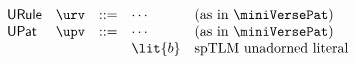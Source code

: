 \[\begin{array}{lllllll}
\mathsf{URule} & \urv & ::= 
& \cdots & \text{(as in $\miniVersePat$)}\\
\mathsf{UPat} & \upv & ::= 
& \cdots & \text{(as in $\miniVersePat$)}\\
&&& \lit{b} & \text{spTLM unadorned literal}
\end{array}\]
